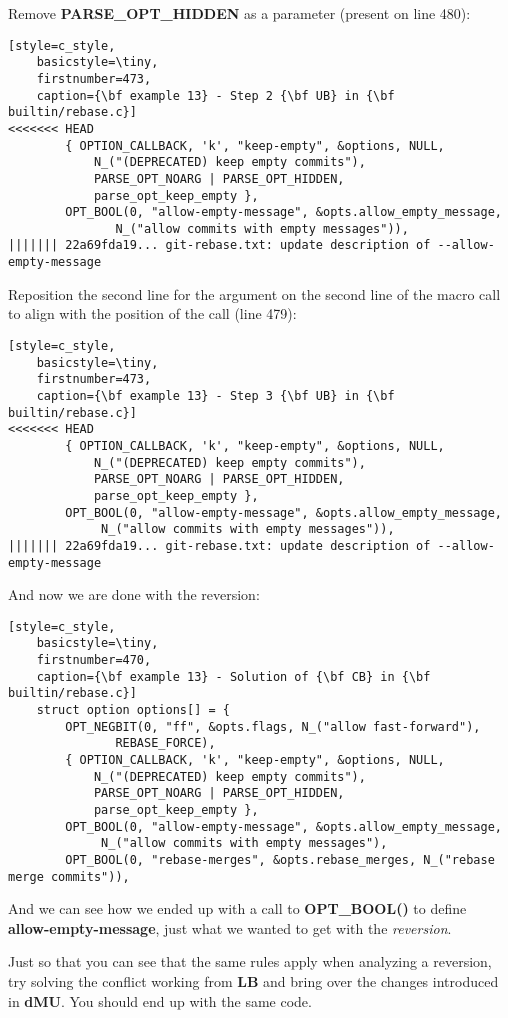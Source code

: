 Remove {\bf PARSE\_OPT\_HIDDEN} as a parameter (present on line 480):
\begin{lstlisting}[style=c_style,
	basicstyle=\tiny,
	firstnumber=473,
	caption={\bf example 13} - Step 2 {\bf UB} in {\bf builtin/rebase.c}]
<<<<<<< HEAD
		{ OPTION_CALLBACK, 'k', "keep-empty", &options, NULL,
			N_("(DEPRECATED) keep empty commits"),
			PARSE_OPT_NOARG | PARSE_OPT_HIDDEN,
			parse_opt_keep_empty },
		OPT_BOOL(0, "allow-empty-message", &opts.allow_empty_message,
			   N_("allow commits with empty messages")),
||||||| 22a69fda19... git-rebase.txt: update description of --allow-empty-message
\end{lstlisting}

Reposition the second line for the argument on the second line of the macro call to align with
the position of the call (line 479):
\begin{lstlisting}[style=c_style,
	basicstyle=\tiny,
	firstnumber=473,
	caption={\bf example 13} - Step 3 {\bf UB} in {\bf builtin/rebase.c}]
<<<<<<< HEAD
		{ OPTION_CALLBACK, 'k', "keep-empty", &options, NULL,
			N_("(DEPRECATED) keep empty commits"),
			PARSE_OPT_NOARG | PARSE_OPT_HIDDEN,
			parse_opt_keep_empty },
		OPT_BOOL(0, "allow-empty-message", &opts.allow_empty_message,
			 N_("allow commits with empty messages")),
||||||| 22a69fda19... git-rebase.txt: update description of --allow-empty-message
\end{lstlisting}

And now we are done with the reversion:

\begin{lstlisting}[style=c_style,
	basicstyle=\tiny,
	firstnumber=470,
	caption={\bf example 13} - Solution of {\bf CB} in {\bf builtin/rebase.c}]
	struct option options[] = {
		OPT_NEGBIT(0, "ff", &opts.flags, N_("allow fast-forward"),
			   REBASE_FORCE),
		{ OPTION_CALLBACK, 'k', "keep-empty", &options, NULL,
			N_("(DEPRECATED) keep empty commits"),
			PARSE_OPT_NOARG | PARSE_OPT_HIDDEN,
			parse_opt_keep_empty },
		OPT_BOOL(0, "allow-empty-message", &opts.allow_empty_message,
			 N_("allow commits with empty messages"),
		OPT_BOOL(0, "rebase-merges", &opts.rebase_merges, N_("rebase merge commits")),
\end{lstlisting}

And we can see how we ended up with a call to {\bf OPT\_BOOL()} to define {\bf allow-empty-message}, just what we wanted
to get with the {\it reversion}.

Just so that you can see that the same rules apply when analyzing a reversion, try solving the conflict working from {\bf LB}
and bring over the changes introduced in {\bf dMU}. You should end up with the same code.

